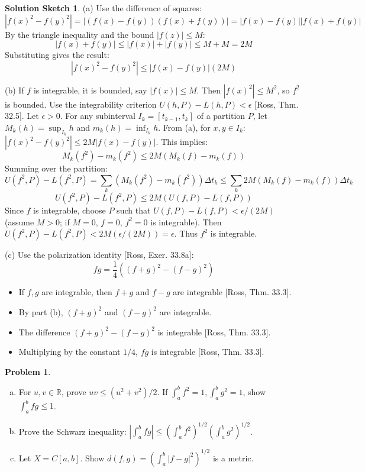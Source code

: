 \documentclass{article}
\newcommand{\R}{\mathbb{R}}
\theoremstyle{definition} %
\newtheorem{problem}{Problem}
\theoremstyle{definition} %
\newtheorem*{solution}{Solution Sketch}
\begin{document}
\begin{solution}
(a) Use the difference of squares:
\[ |f(x)^2 - f(y)^2| = |(f(x)-f(y))(f(x)+f(y))| = |f(x)-f(y)| |f(x)+f(y)| \]
By the triangle inequality and the bound $|f(z)| \le M$:
\[ |f(x)+f(y)| \le |f(x)|+|f(y)| \le M+M = 2M \]
Substituting gives the result:
\[ |f(x)^2 - f(y)^2| \le |f(x)-f(y)| (2M) \]

(b) If $f$ is integrable, it is bounded, say $|f(x)| \le M$. Then $|f(x)^2| \le M^2$, so $f^2$ is bounded.
Use the integrability criterion $U(h,P) - L(h,P) < \epsilon$ [Ross, Thm. 32.5]. Let $\epsilon > 0$.
For any subinterval $I_k = [t_{k-1}, t_k]$ of a partition $P$, let $M_k(h) = \sup_{I_k} h$ and $m_k(h) = \inf_{I_k} h$. From (a), for $x,y \in I_k$: $|f(x)^2 - f(y)^2| \le 2M |f(x) - f(y)|$. This implies:
\[ M_k(f^2) - m_k(f^2) \le 2M (M_k(f) - m_k(f)) \]
Summing over the partition:
\[ U(f^2, P) - L(f^2, P) = \sum_k (M_k(f^2) - m_k(f^2)) \Delta t_k \le \sum_k 2M (M_k(f) - m_k(f)) \Delta t_k \]
\[ U(f^2, P) - L(f^2, P) \le 2M (U(f, P) - L(f, P)) \]
Since $f$ is integrable, choose $P$ such that $U(f, P) - L(f, P) < \epsilon/(2M)$ (assume $M>0$; if $M=0$, $f=0$, $f^2=0$ is integrable).
Then $U(f^2, P) - L(f^2, P) < 2M (\epsilon/(2M)) = \epsilon$. Thus $f^2$ is integrable.

(c) Use the polarization identity [Ross, Exer. 33.8a]:
\[ fg = \frac{1}{4} \left( (f+g)^2 - (f-g)^2 \right) \]
\begin{itemize}
    \item If $f, g$ are integrable, then $f+g$ and $f-g$ are integrable [Ross, Thm. 33.3].
    \item By part (b), $(f+g)^2$ and $(f-g)^2$ are integrable.
    \item The difference $(f+g)^2 - (f-g)^2$ is integrable [Ross, Thm. 33.3].
    \item Multiplying by the constant $1/4$, $fg$ is integrable [Ross, Thm. 33.3].
\end{itemize}
\end{solution}

\begin{problem}
\begin{enumerate}[(a)]
  \item For $u,v\in \R$, prove $uv \le (u^2+v^2)/2$. If $\int_a^b f^2 = 1, \int_a^b g^2 = 1$, show $\int_a^b fg \le 1$.
  \item Prove the Schwarz inequality: $|\int_a^b fg| \le (\int_a^b f^2)^{1/2} (\int_a^b g^2)^{1/2}$.
  \item Let $X=C[a,b]$. Show $d(f,g) = (\int_a^b |f-g|^2)^{1/2}$ is a metric.
\end{enumerate}
\end{problem}
\end{document}
